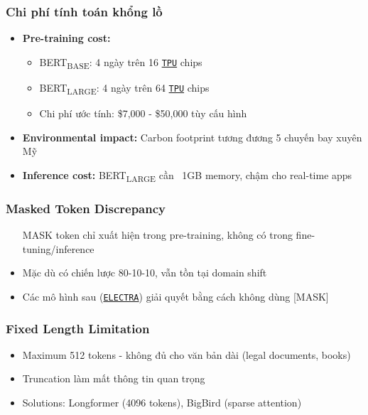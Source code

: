 \subsubsection{Chi phí tính toán khổng lồ}
\begin{itemize}
    \item \textbf{Pre-training cost:}
    \begin{itemize}
        \item BERT\textsubscript{BASE}: 4 ngày trên 16 \hyperref[acro:tpu]{\texttt{TPU}} chips
        \item BERT\textsubscript{LARGE}: 4 ngày trên 64 \hyperref[acro:tpu]{\texttt{TPU}} chips
        \item Chi phí ước tính: \$7,000 - \$50,000 tùy cấu hình
    \end{itemize}
    \item \textbf{Environmental impact:} Carbon footprint tương đương 5 chuyến bay xuyên Mỹ
    \item \textbf{Inference cost:} BERT\textsubscript{LARGE} cần ~1GB memory, chậm cho real-time apps
\end{itemize}

\subsubsection{Masked Token Discrepancy}
\begin{itemize}
    \item [MASK] token chỉ xuất hiện trong pre-training, không có trong fine-tuning/inference
    \item Mặc dù có chiến lược 80-10-10, vẫn tồn tại domain shift
    \item Các mô hình sau (\hyperref[acro:electra]{\texttt{ELECTRA}}) giải quyết bằng cách không dùng [MASK]
\end{itemize}

\subsubsection{Fixed Length Limitation}
\begin{itemize}
    \item Maximum 512 tokens - không đủ cho văn bản dài (legal documents, books)
    \item Truncation làm mất thông tin quan trọng
    \item Solutions: Longformer (4096 tokens), BigBird (sparse attention)
\end{itemize}

